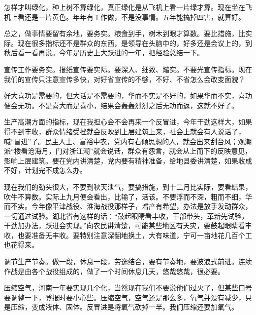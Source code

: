 怎样才叫绿化，种上树不算绿化，真正绿化是从飞机上看一片绿才算。现在坐在飞机上看还是一片黄色。年年有工作做，不是没事情。五年能搞掉四害，就算好。

总之，做事情要留有余地，要务实。粮食到手，树木到眼才算数。要比措施，比实际。现在很多指标还不是群众的东西，是领导在头脑中的，好多还是会议上的，到秋后看一看再说。今年是历史上大跃进的一年，把经验总结一下。

宣传工作要务实。报纸宣传要实际。要深入、细致、踏实。不要光宣传指标。现在我们的宣传只注意宣传多快，对好省宣传的不够，不好、不省怎么会改变面貌？

好大喜功是需要的，但大话是不需要的，华而不实是不好的，如果华而不实，喜功便会无功。不是喜大而是喜小，结果会轰轰烈烈之后无功而返，这就不好了。

生产高潮方面的指标，现在我担心会不会再来一个反冒进，今年干劲这样大，如果得不到丰收，群众情绪受挫就会反映到上层建筑上来，社会上就会有人说话了，喊“冒进”了。民主人士、富裕中农，党内有右倾思想的人，就会出来刮台风；观潮派“楼看沧海月，门对浙江潮”就会说话，群众有怨言，就会从上而下的反映意见，影响上层建筑。要在党内讲清楚，党内要有精神准备，给地县委讲清楚，如果收成不好，计划完不成怎么办。

现在我们的劲头很大，不要到秋天泄气，要搞措施，到十二月比实际，要看结果，吹牛不算数。实际上九月便会看出，比输了，活该。不要浮而不深，粗而不细，华而不实。今年像平津战役、淮海战役那样子，增产有希望，办法是放手发动群众，一切通过试验。湖北省有这样的话：“鼓起眼睛看丰收，干部带头，革新先试验，干劲加办法，跃进会实现。”向农民讲清楚，可能某些地区有天灾，要鼓起眼睛看丰收，也要准备无丰收。要特别注意深翻地换土，大有味道，宁可一亩地花几百个工也花得来。

调节生产节奏。做一段，休息一段，劳逸结合，要有节奏地，要波浪式前进。连续作战是由各个战役组成的，做了一个时间休息几天，悠哉悠哉，很必要。

压缩空气，河南一年要实现几个化，当然现在我们不要说他们过火了，但某些口号要调整一下，登报时要小心些。压缩空气，空气还是那么多，氧气并没有减少，只是压缩，变成液体、固体。反冒进是将氧气砍掉一半。我们压缩还要加氧气。

